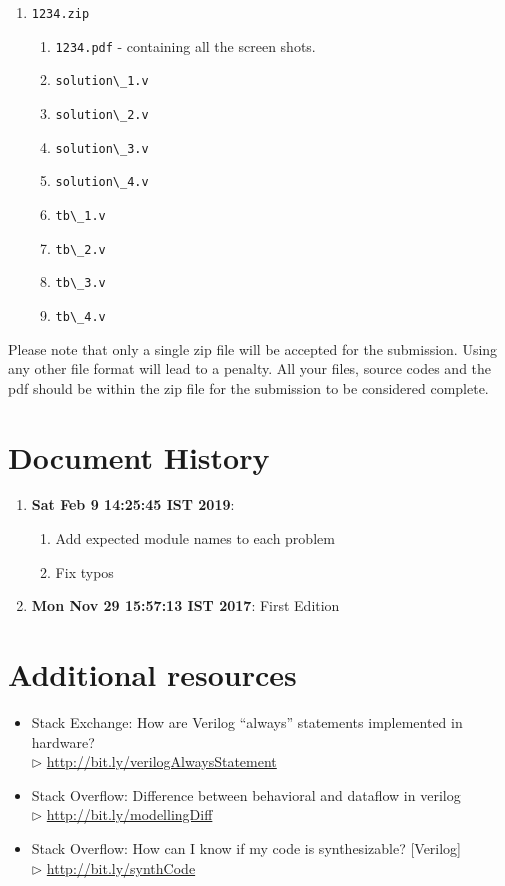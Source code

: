 \documentclass[a4paper,10pt]{article}
\theoremstyle{mytheor}
\newcommand{\inlinev}[1]{\lstinline[style=verilog-inline-style]{#1}}
\newcommand{\histitem}[2]{
  \footnotesize
  \item \textbf{#1}: #2
  \normalsize
}
\newcommand{\amurl}[1]{%
  {\color{blue}\url{#1}}
}
\begin{document}
\begin{enumerate}
\item \inlinev{1234.zip}
  \begin{enumerate}
  \item \inlinev{1234.pdf} - containing
    all the screen shots.
  \item \inlinev{solution\_1.v}
  \item \inlinev{solution\_2.v}
  \item \inlinev{solution\_3.v}
  \item \inlinev{solution\_4.v}
  \item \inlinev{tb\_1.v}
  \item \inlinev{tb\_2.v}
  \item \inlinev{tb\_3.v}
  \item \inlinev{tb\_4.v}
  \end{enumerate}
\end{enumerate}

Please note that only a single zip file will be accepted for the
submission. Using any other file format will lead to a
{\color{red}penalty}. All your files, source codes and the pdf should
be within the zip file for the submission to be considered complete.

\section*{Document History}
\begin{enumerate}
  \histitem{Sat Feb  9 14:25:45 IST 2019}{
    \begin{enumerate}
    \item Add expected module names to each problem
    \item Fix typos
    \end{enumerate}
  }
  \histitem{Mon Nov 29 15:57:13 IST 2017} {
    First Edition
  }
\end{enumerate}

\section*{Additional resources}
\begin{itemize}
  \small 
\item Stack Exchange: How are Verilog ``always'' statements implemented
  in hardware? \\$\rhd$ \amurl{http://bit.ly/verilogAlwaysStatement}
\item Stack Overflow: Difference between behavioral and dataflow in
  verilog \\$\rhd$ \amurl{http://bit.ly/modellingDiff}
\item Stack Overflow: How can I know if my code is synthesizable?
  [Verilog] \\$\rhd$ \amurl{http://bit.ly/synthCode}
\end{itemize} 
\end{document}
